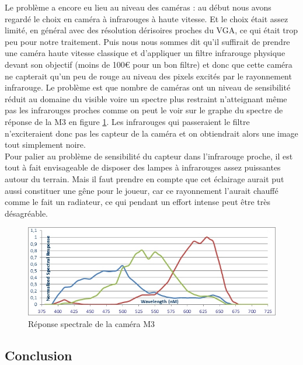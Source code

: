 Le problème a encore eu lieu au niveau des caméras : au début nous avons regardé le choix en caméra à infrarouges à haute vitesse. Et le choix était assez limité, en général avec des résolution dérisoires proches du VGA, ce qui était trop peu pour notre traitement. Puis nous nous sommes dit qu'il suffirait de prendre une caméra haute vitesse classique et d'appliquer un filtre infrarouge physique devant son objectif (moins de 100€ pour un bon filtre) et donc que cette caméra ne capterait qu'un peu de rouge au niveau des pixels excités par le rayonnement infrarouge. Le problème est que nombre de caméras ont un niveau de sensibilité réduit au domaine du visible voire un spectre plus restraint n'atteignant même pas les infrarouges proches comme on peut le voir sur le graphe du spectre de réponse de la M3 en figure \ref{img_repspectrm3}. Les infrarouges qui passeraient le filtre n'exciteraient donc pas les capteur de la caméra et on obtiendrait alors une image tout simplement noire.\\

Pour palier au problème de sensibilité du capteur dans l'infrarouge proche, il est tout à fait envisageable de disposer des lampes à infrarouges assez puissantes autour du terrain. Mais il faut prendre en compte que cet éclairage aurait put aussi constituer une gêne pour le joueur, car ce rayonnement l'aurait chauffé comme le fait un radiateur, ce qui pendant un effort intense peut être très désagréable. 


\begin{figure}[h]
\begin{center}
\includegraphics[width=\textwidth]{histom3.jpg}
\caption{Réponse spectrale de la caméra M3}
\label{img_repspectrm3}
\end{center}
\end{figure}




\subsection{Conclusion}

